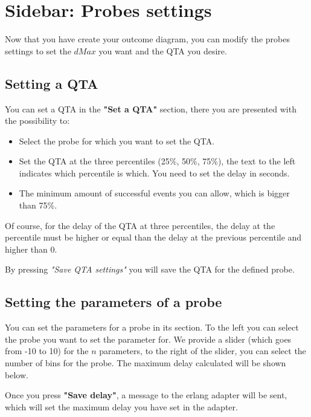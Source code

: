 \section{Sidebar: Probes settings}
    Now that you have create your outcome diagram, you can modify the probes settings to set the $dMax$ you want and the QTA you desire.

\subsection{Setting a QTA}
    You can set a QTA in the \textbf{"Set a QTA"} section, there you are presented with the possibility to:
    \begin{itemize}
        \item Select the probe for which you want to set the QTA.
        \item Set the QTA at the three percentiles (25\%, 50\%, 75\%), the text to the left indicates which percentile is which. You need to set the delay in seconds.
        \item The minimum amount of successful events you can allow, which is bigger than 75\%.
    \end{itemize}
    Of course, for the delay of the QTA at three percentiles, the delay at the percentile must be higher or equal than the delay at the previous percentile and higher than 0.
    
    By pressing \textit{"Save QTA settings"} you will save the QTA for the defined probe.

\subsection{Setting the parameters of a probe}
    You can set the parameters for a probe in its section.
    To the left you can select the probe you want to set the parameter for. 
    We provide a slider (which goes from -10 to 10) for the $n$ parameters, to the right of the slider, you can select the number of bins for the probe. The maximum delay calculated will be shown below.

    Once you press \textbf{"Save delay"}, a message to the erlang adapter will be sent, which will set the maximum delay you have set in the adapter.

